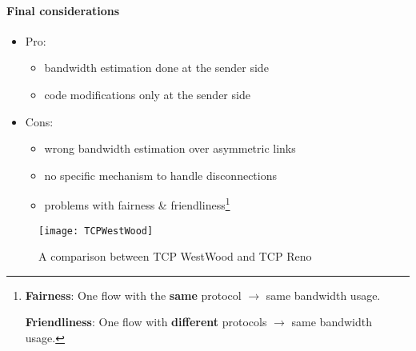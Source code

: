 \paragraph*{Final considerations}
\begin{itemize}
\item Pro:
  \begin{itemize}
    \item bandwidth estimation done at the sender side
    \item code modifications only at the sender side
  \end{itemize}
\item Cons:
  \begin{itemize}
  \item wrong bandwidth estimation over asymmetric links
  \item no specific mechanism to handle disconnections
  \item problems with fairness \& friendliness\footnote{\textbf{Fairness}:
    One flow with the \textbf{same} protocol $\rightarrow$ same
    bandwidth usage.
    
    \textbf{Friendliness}: One flow with \textbf{different} protocols
    $\rightarrow$ same bandwidth usage.}
  \end{itemize}
\end{itemize}

\begin{figure}[t]
\centering
\texttt{[image: TCPWestWood]}
\caption[TCP WestWood vs TCP Reno]{A comparison between TCP WestWood and TCP Reno}
\label{fig:tcpw:tcpwwvstcpr}
\end{figure}
